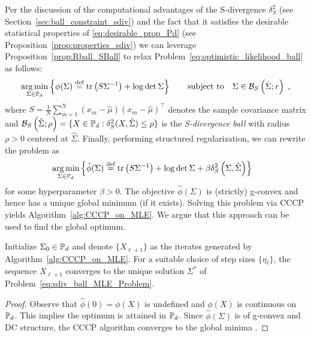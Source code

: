 \documentclass[sn-nature]{sn-jnl}%
\theoremstyle{thmstyleone}%
\theoremstyle{thmstyletwo}%
\theoremstyle{thmstylethree}%
\begin{document}
Per the discussion of the computational advantages of the S-divergence $\delta_S^2$ (see Section~\ref{sec:ball_constraint_sdiv}) and the fact that it satisfies the desirable statistical properties of \eqref{eq:desirable_prop_Pd} (see Proposition~\ref{prop:properties_sdiv}) we can leverage Proposition~\ref{prop:Rball_SBall} to relax Problem~\eqref{eq:optimistic_likelihood_ball} as follows:
%
\begin{equation}\label{eq:sdiv_ball_MLE_Problem}
\begin{aligned}
    \operatorname*{arg\,min}_{\Sigma \in \mathbb{P}_d} \left\{ \phi(\Sigma) \stackrel{\text{def}}{=} \text{tr}\left(S \Sigma^{-1}\right) + \log \det \Sigma  \right\} \qquad 
    \text{subject to} \quad \Sigma \in \mathcal{B}_{S}\left(\hat{\Sigma}; r \right) \; ,
\end{aligned}    
\end{equation}
%
where   $S = \frac{1}{N}\sum_{m=1}^N \left(x_m - \hat{\mu}\right)\left(x_m - \hat{\mu}\right)^\top$ denotes the sample covariance matrix and $\mathcal{B}_S\left(\hat{\Sigma};\rho\right) = \{X \in \mathbb{P}_d : \delta_S^2(X, \hat{\Sigma}) \leq \rho \}$ is the \textit{S-divergence ball} with radius $\rho>0$ centered at $\hat{\Sigma}$.  Finally, performing structured regularization, we can rewrite the problem as
\begin{equation}\label{eq:sdiv_ball_MLE_Problem}
\begin{aligned}
    &\operatorname*{arg\,min}_{\Sigma \in \mathbb{P}_d} \left\{ \hat{\phi}(\Sigma) \stackrel{\text{def}}{=} \text{tr}\left(S \Sigma^{-1}\right) + \log \det \Sigma  + \beta \delta_S^2\left(\Sigma, \hat{\Sigma}\right) \right\} 
\end{aligned}    
\end{equation}
for some hyperparameter $\beta >0.$ The objective $\hat{\phi}(\Sigma)$ is (strictly) g-convex and hence has a unique global minimum (if it exists). 
Solving this problem via CCCP yields Algorithm~\ref{alg:CCCP_on_MLE}. 
We argue that this approach can be used to find the global optimum.\\
%
\begin{corollary}
    Initialize $\Sigma_0 \in \mathbb{P}_d$ and denote $\{X_{\ell+1}\}$ as the iterates generated by Algorithm~\ref{alg:CCCP_on_MLE}. For a suitable choice of step sizes $\{\eta_{\ell}\}$, the sequence $X_{\ell+1}$ converges to the unique solution $\Sigma^*$ of Problem~\eqref{eq:sdiv_ball_MLE_Problem}.
\end{corollary}

\begin{proof}
    Observe that $\hat{\phi}(0) = \phi(X)$ is undefined and $\phi(X)$ is continuous on $\mathbb{P}_d$.  This implies the optimum is attained in $\mathbb{P}_d$. Since $\hat{\phi}(\Sigma)$ is of g-convex and DC structure, the CCCP algorithm converges to the global minima \cite{pmlr-v202-weber23a}.
\end{proof}
\end{document}
